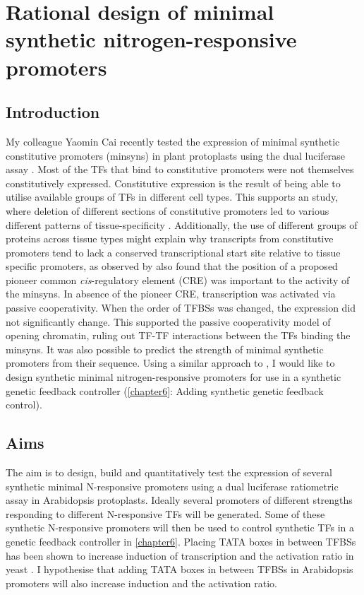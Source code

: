 \documentclass[../main.tex]{subfiles}
\begin{document}
\chapter{Rational design of minimal synthetic nitrogen-responsive promoters}\label{chapter5}
\section{Introduction}\label{chapter5:introduction}
My colleague Yaomin Cai recently tested the expression of minimal synthetic constitutive promoters (minsyns) in plant protoplasts using the dual luciferase assay \autocite{caiRationalDesignMinimal2020}.
Most of the TFs that bind to constitutive promoters were not themselves constitutively expressed.
Constitutive expression is the result of being able to utilise available groups of TFs in different cell types.
This supports an study, where deletion of different sections of constitutive promoters led to various different patterns of tissue-specificity \autocite{benfeyTissuespecificExpressionCaMV1990}.
Additionally, the use of different groups of proteins across tissue types might explain why transcripts from constitutive promoters tend to lack a conserved transcriptional start site relative to tissue specific promoters, as observed by %
\textcite*{caiRationalDesignMinimal2020} also found that the position of a proposed pioneer common \textit{cis}\hyp{}regulatory element (CRE) was important to the activity of the minsyns.
In absence of the pioneer CRE, transcription was activated via passive cooperativity.
When the order of TFBSs was changed, the expression did not significantly change.
This supported the passive cooperativity model of opening chromatin, ruling out TF-TF interactions between the TFs binding the minsyns.
It was also possible to predict the strength of minimal synthetic promoters from their sequence.
Using a similar approach to \textcite*{caiRationalDesignMinimal2020}, I would like to design synthetic minimal nitrogen-responsive promoters for use in a synthetic genetic feedback controller (\autoref{chapter6}: Adding synthetic genetic feedback control).
\section{Aims}\label{chapter5:aims}
The aim is to design, build and quantitatively test the expression of several synthetic minimal N\hyp{}responsive promoters using a dual luciferase ratiometric assay in Arabidopsis protoplasts.
Ideally several promoters of different strengths responding to different N\hyp{}responsive TFs will be generated.
Some of these synthetic N\hyp{}responsive promoters will then be used to control synthetic TFs in a genetic feedback controller in \autoref{chapter6}.
Placing TATA boxes in between TFBSs has been shown to increase induction of transcription and the activation ratio in yeast \autocite{kotopkaModeldrivenGenerationArtificial2020}.
I hypothesise that adding TATA boxes in between TFBSs in Arabidopsis promoters will also increase induction and the activation ratio.
\end{document}
